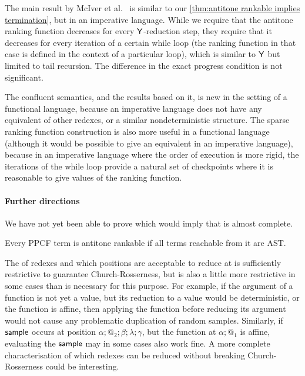 The main result by McIver et al.~\cite{DBLP:journals/pacmpl/McIverMKK18} is similar to our \cref{thm:antitone rankable implies termination}, but in an imperative language. While we require that the antitone ranking function decreases for every $\mathsf{Y}$-reduction step, they require that it decreases for every iteration of a certain while loop (the ranking function in that case is defined in the context of a particular loop), which is similar to $\mathsf{Y}$ but limited to tail recursion. 
The difference in the exact progress condition is not significant. 

The confluent semantics, and the results based on it, is new in the setting of a functional language, because an imperative language does not have any equivalent of other redexes, or a similar nondeterministic structure. The sparse ranking function construction is also more useful in a functional language (although it would be possible to give an equivalent in an imperative language), because in an imperative language where the order of execution is more rigid, the iterations of the while loop provide a natural set of checkpoints where it is reasonable to give values of the ranking function.

\paragraph*{Further directions} We have not yet been able to prove  which would imply that  is almost complete.
\begin{conjecture}[Completeness]
\label{conj:antitone}
Every PPCF term is antitone rankable if all terms reachable from it are AST.
\end{conjecture}

The  of redexes and which positions are acceptable to reduce at is sufficiently restrictive to guarantee Church-Rosserness, but is also a little more restrictive in some cases than is necessary for this purpose. For example, if the argument of a function is not yet a value, but its reduction to a value would be deterministic, or the function is affine, then applying the function before reducing its argument would not cause any problematic duplication of random samples. Similarly, if $\mathsf{sample}$ occurs at position $\alpha;@_2;\beta;\lambda;\gamma$, but the function at $\alpha;@_1$ is affine, evaluating the $\mathsf{sample}$ may in some cases also work fine. A more complete characterisation of which redexes can be reduced without breaking Church-Rosserness could be interesting.

